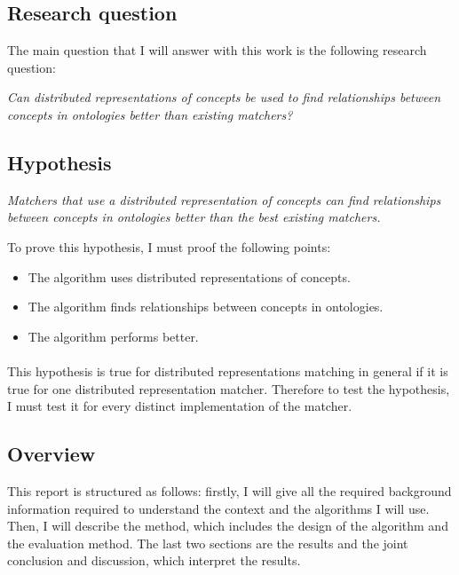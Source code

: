 \documentclass{article}
\begin{document}
 \subsection{Research question} \label{researchquestion}
 The main question that I will answer with this work is the following research question:
 
 \begin{center}
 \textit{
 Can distributed representations of concepts be used to find relationships between concepts in ontologies better than existing matchers?
 }
 \end{center}
 
 \subsection{Hypothesis} \label{hypotheses}
 
 \begin{center}
 \textit{Matchers that use a distributed representation of concepts can find relationships between concepts in ontologies better than the best existing matchers.}
 \end{center}

 To prove this hypothesis, I must proof the following points:
 \begin{itemize}
 \item The algorithm uses distributed representations of concepts.
 \item The algorithm finds relationships between concepts in ontologies.
 \item The algorithm performs better.
 \end{itemize} 
 
 \paragraph{}
 This hypothesis is true for distributed representations matching in general if it is true for one distributed representation matcher. Therefore to test the hypothesis, I must test it for every distinct implementation of the matcher.
 
 \subsection{Overview}
 This report is structured as follows: firstly, I will give all the required background information required to understand the context and the algorithms I will use. Then, I will describe the method, which includes the design of the algorithm and the evaluation method. The last two sections are the results and the joint conclusion and discussion, which interpret the results.
 
\end{document}

